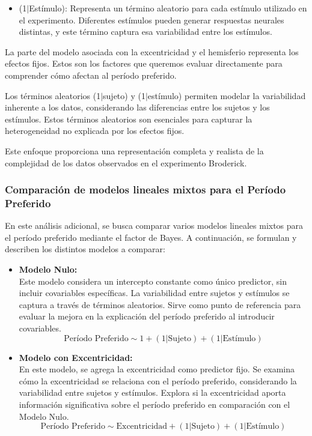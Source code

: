 {\begin{itemize}
	\item (1$|$Est\'imulo): Representa un término aleatorio para cada estímulo utilizado en el experimento. Diferentes estímulos pueden generar respuestas neurales distintas, y este término captura esa variabilidad entre los estímulos.
	
\end{itemize}

La parte del modelo asociada con la excentricidad y el hemisferio representa los efectos fijos. Estos son los factores que queremos evaluar directamente para comprender cómo afectan al período preferido.

Los términos aleatorios (1$|$sujeto) y (1$|$estímulo) permiten modelar la variabilidad inherente a los datos, considerando las diferencias entre los sujetos y los estímulos. Estos términos aleatorios son esenciales para capturar la heterogeneidad no explicada por los efectos fijos.

Este enfoque proporciona una representación completa y realista de la complejidad de los datos observados en el experimento Broderick.

\subsubsection{Comparaci\'on de modelos lineales mixtos para el Período Preferido}

En este análisis adicional, se busca comparar varios modelos lineales mixtos para el período preferido mediante el factor de Bayes. A continuación, se formulan y describen los distintos modelos a comparar:

\begin{itemize}
	\item \textbf{Modelo Nulo:}	\\
	Este modelo considera un intercepto constante como único predictor, sin incluir covariables específicas. La variabilidad entre sujetos y estímulos se captura a través de términos aleatorios. Sirve como punto de referencia para evaluar la mejora en la explicación del período preferido al introducir covariables.
	\begin{equation}
		\text{Período Preferido} \sim 1 + (1|\text{Sujeto}) + (1|\text{Estímulo})	
	\end{equation}

	\item\textbf{Modelo con Excentricidad:}\\
	En este modelo, se agrega la excentricidad como predictor fijo. Se examina cómo la excentricidad se relaciona con el período preferido, considerando la variabilidad entre sujetos y estímulos. Explora si la excentricidad aporta información significativa sobre el período preferido en comparación con el Modelo Nulo.
	\begin{equation}
		\text{Período Preferido} \sim \text{Excentricidad} + (1|\text{Sujeto}) + (1|\text{Estímulo})	
	\end{equation}


\end{itemize}}
